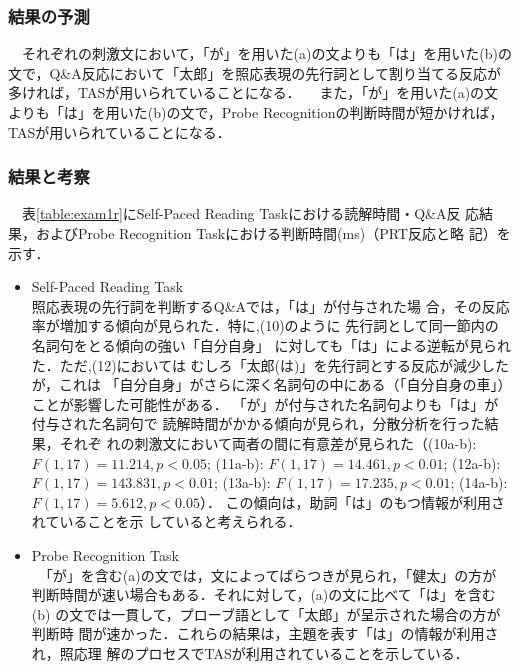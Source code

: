 \subsubsection{結果の予測}
　それぞれの刺激文において，「が」を用いた(a)の文よりも「は」を用いた(b)の文で，Q\&A反応において「太郎」を照応表現の先行詞として割り当てる反応が多ければ，TASが用いられていることになる．
　また，「が」を用いた(a)の文よりも「は」を用いた(b)の文で，Probe
Recognitionの判断時間が短かければ，TASが用いられていることになる．

\subsubsection{結果と考察}
　表\ref{table:exam1r}にSelf-Paced Reading Taskにおける読解時間・Q\&A反
応結果，およびProbe Recognition Taskにおける判断時間(ms)（PRT反応と略
記）を示す．

\begin{itemize}
  \item Self-Paced Reading Task\\
 照応表現の先行詞を判断するQ\&Aでは，「は」が付与された場
合，その反応率が増加する傾向が見られた．特に,(10)のように
先行詞として同一節内の名詞句をとる傾向の強い「自分自身」
に対しても「は」による逆転が見られた．ただ,(12)においては
むしろ「太郎(は)」を先行詞とする反応が減少したが，これは
「自分自身」がさらに深く名詞句の中にある（「自分自身の車」）
ことが影響した可能性がある．
「が」が付与された名詞句よりも「は」が付与された名詞句で
読解時間がかかる傾向が見られ，分散分析を行った結果，それぞ
れの刺激文において両者の間に有意差が見られた（(10a-b):
$F(1,17)=11.214, p<0.05$; (11a-b): $F(1,17)=14.461, p<0.01$;
(12a-b): $F(1,17)=143.831, p<0.01$; (13a-b): $F(1,17)=17.235, 
p<0.01$; (14a-b): $F(1,17)=5.612, p<0.05$）．
この傾向は，助詞「は」のもつ情報が利用されていることを示
していると考えられる．

  \item Probe Recognition Task\\
　「が」を含む(a)の文では，文によってばらつきが見られ，「健太」の方が
判断時間が速い場合もある．それに対して，(a)の文に比べて「は」を含む(b)
の文では一貫して，プローブ語として「太郎」が呈示された場合の方が判断時
間が速かった．これらの結果は，主題を表す「は」の情報が利用され，照応理
解のプロセスでTASが利用されていることを示している．
\end{itemize}


